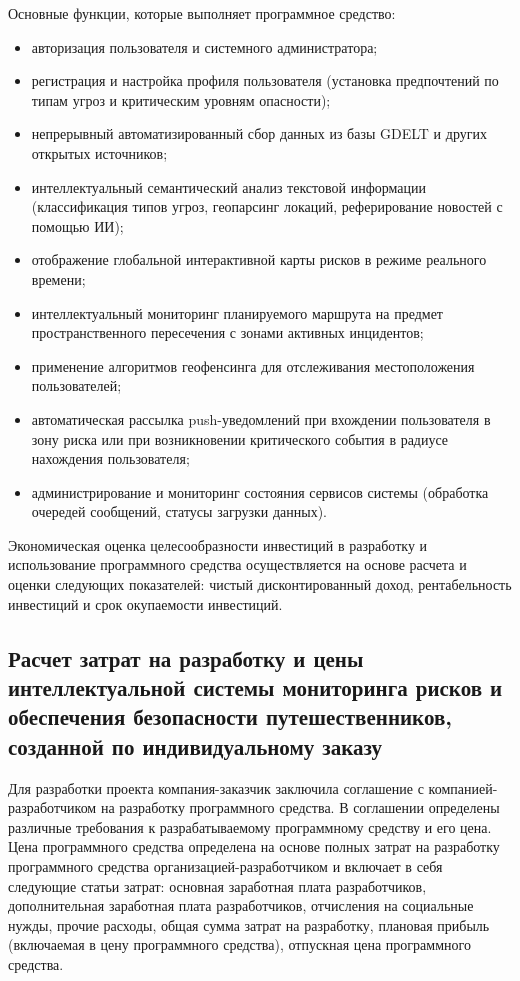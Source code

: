Основные функции, которые выполняет программное средство:
\begin{itemize}
\item авторизация пользователя и системного администратора;
\item регистрация и настройка профиля пользователя (установка предпочтений по типам угроз и критическим уровням опасности);
\item непрерывный автоматизированный сбор данных из базы GDELT и других открытых источников;
\item интеллектуальный семантический анализ текстовой информации (классификация типов угроз, геопарсинг локаций, реферирование новостей с помощью ИИ);
\item отображение глобальной интерактивной карты рисков в режиме реального времени;
\item интеллектуальный мониторинг планируемого маршрута на предмет пространственного пересечения с зонами активных инцидентов;
\item применение алгоритмов геофенсинга для отслеживания местоположения пользователей;
\item автоматическая рассылка push-уведомлений при вхождении пользователя в зону риска или при возникновении критического события в радиусе нахождения пользователя;
\item администрирование и мониторинг состояния сервисов системы (обработка очередей сообщений, статусы загрузки данных).
\end{itemize}

Экономическая оценка целесообразности инвестиций в разработку и использование программного средства осуществляется на основе расчета и оценки следующих показателей: чистый дисконтированный доход, рентабельность инвестиций и срок окупаемости инвестиций.

\subsection{Расчет затрат на разработку и цены интеллектуальной системы мониторинга рисков и обеспечения безопасности путешественников, созданной по индивидуальному заказу}

Для разработки проекта компания-заказчик заключила соглашение с компанией-разработчиком на разработку программного средства. В соглашении определены различные требования к разрабатываемому программному средству и его цена. Цена программного средства определена на основе полных затрат на разработку программного средства организацией-разработчиком и включает в себя следующие статьи затрат: основная заработная плата разработчиков, дополнительная заработная плата разработчиков, отчисления на социальные нужды, прочие расходы, общая сумма затрат на разработку, плановая прибыль (включаемая в цену программного средства), отпускная цена программного средства.

